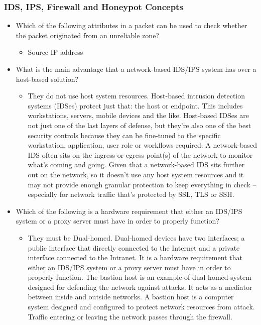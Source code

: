 \subsubsection{IDS, IPS, Firewall and Honeypot Concepts}
\begin{itemize}
    \item Which of the following attributes in a packet can be used to check whether the packet originated from an unreliable zone?
    \begin{itemize}
        \item Source IP address
    \end{itemize}
    \item What is the main advantage that a network-based IDS/IPS system has over a host-based solution?
    \begin{itemize}
        \item They do not use host system resources. Host-based intrusion detection systems (IDSes) protect just that: the host or endpoint. This includes workstations, servers, mobile devices and the like. Host-based IDSes are not just one of the last layers of defense, but they're also one of the best security controls because they can be fine-tuned to the specific workstation, application, user role or workflows required. A network-based IDS often sits on the ingress or egress point(s) of the network to monitor what's coming and going. Given that a network-based IDS sits further out on the network, so it doesn't use any host system resources and it may not provide enough granular protection to keep everything in check -- especially for network traffic that's protected by SSL, TLS or SSH.
    \end{itemize}
    \item Which of the following is a hardware requirement that either an IDS/IPS system or a proxy server must have in order to properly function?
    \begin{itemize}
        \item They must be Dual-homed. Dual-homed devices have two interfaces; a public interface that directly connected to the Internet and a private interface connected to the Intranet. It is a hardware requirement that either an IDS/IPS system or a proxy server must have in order to properly function. The bastion host is an example of dual-homed system designed for defending the network against attacks. It acts as a mediator between inside and outside networks. A bastion host is a computer system designed and configured to protect network resources from attack. Traffic entering or leaving the network passes through the firewall.

\end{itemize}
\end{itemize}
